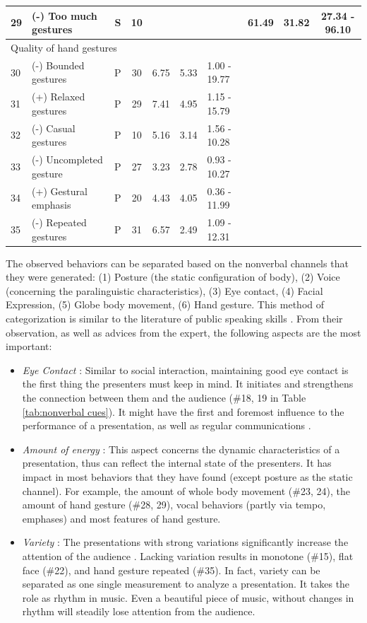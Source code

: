 \begin{table}
{\begin{tabular}{llcclllccc}
29 & (-) Too much gestures & S & 10 &  &  &  & 61.49 & 31.82 & 27.34 - 96.10 \\ \hline
\multicolumn{10}{l}{Quality of hand gestures} \\
30 & (-) Bounded gestures & P & 30 & 6.75 & 5.33 & 1.00 - 19.77 &  &  &  \\
31 & (+) Relaxed gestures & P & 29 & 7.41 & 4.95 & 1.15 - 15.79 &  &  &  \\
32 & (-) Casual gestures & P & 10 & 5.16 & 3.14 & 1.56 - 10.28 &  &  &  \\
33 & (-) Uncompleted gesture & P & 27 & 3.23 & 2.78 & 0.93 - 10.27 &  &  &  \\
34 & (+) Gestural emphasis & P & 20 & 4.43 & 4.05 & 0.36 - 11.99 &  &  &  \\
35 & (-) Repeated gestures & P & 31 & 6.57 & 2.49 & 1.09 - 12.31 &  &  &  \\ \hline
\end{tabular}%
}
\end{table}
\newpage
\par The observed behaviors can be separated based on the nonverbal channels that they were generated: (1) Posture (the static configuration of body), (2) Voice (concerning the paralinguistic characteristics), (3) Eye contact, (4) Facial Expression, (5) Globe body movement, (6) Hand gesture. This method of categorization is similar to the literature of public speaking skills \cite{rodman1996style}. From their observation, as well as advices from the expert, the following aspects are the most important:

\begin{itemize}
  \item \textit{Eye Contact} : Similar to social interaction, maintaining good eye contact is the first thing the presenters must keep in mind. It initiates and strengthens the connection between them and the audience (\#18, 19 in Table \ref{tab:nonverbal cues}). It might have the first and foremost influence to the performance of a presentation, as well as regular communications \cite{Zimmerman2009}.
  \item \textit{Amount of energy} : This aspect concerns the dynamic characteristics of a presentation, thus can reflect the internal state of the presenters. It has impact in most behaviors that they have found (except posture as the static channel). For example, the amount of whole body movement (\#23, 24), the amount of hand gesture (\#28, 29), vocal behaviors (partly via tempo, emphases) and most features of hand gesture.
  \item \textit{Variety} : The presentations with strong variations significantly increase the attention of the audience \cite{nguyen2015intelligent}. Lacking variation results in monotone (\#15), flat face (\#22), and hand gesture repeated (\#35). In fact, variety can be separated as one single measurement to analyze a presentation. It takes the role as rhythm in music. Even a beautiful piece of music, without changes in rhythm will steadily lose attention from the audience.  

\end{itemize}


